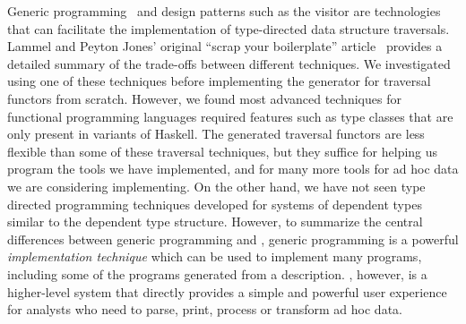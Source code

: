 Generic programming~\cite{jeuring+:polytypic-programming,hinze+:generic-programming,lammel+:syb} and design patterns such as the visitor are
technologies that can facilitate the implementation of 
type-directed data structure traversals.  Lammel and Peyton Jones' 
original ``scrap your
boilerplate'' article~\cite{lammel+:syb} provides a detailed summary
of the trade-offs between different techniques.  We investigated using
one of these techniques before implementing the generator for
\padsml{} traversal functors from scratch.  However, we found most
advanced techniques for functional programming languages required
features such as type classes that are only present in variants of
Haskell.  The generated \padsml{} traversal functors are less flexible
than some of these traversal techniques, but they suffice for helping
us program the tools we have implemented, and for many more tools for ad
hoc data we are considering implementing.  On the other hand,
we have not seen type directed programming techniques developed for
systems of dependent types similar to the \padsml{} dependent type
structure.  However, to summarize the central differences
between generic programming and \padsml{}, generic programming is
a powerful {\em implementation technique} which can be used to implement
many programs, including some of the programs generated from a 
\padsml{} description.
\padsml{}, however, is a higher-level system
that directly provides a simple and powerful user experience
for analysts who need to parse, print, process or transform 
ad hoc data.  



  




